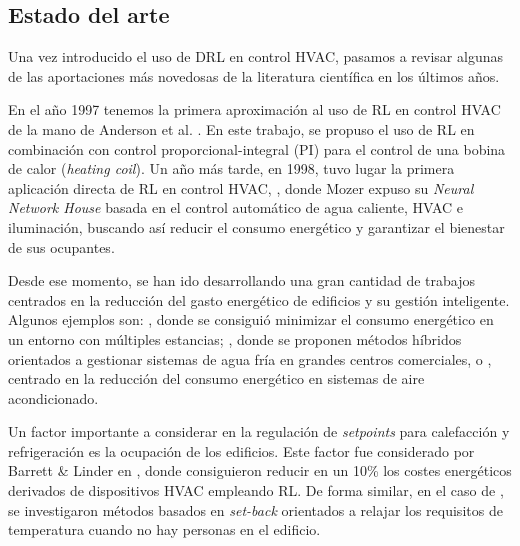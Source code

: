\subsection{Estado del arte}
\label{sec:estado-del-arte}

Una vez introducido el uso de DRL en control HVAC, pasamos a revisar algunas de las aportaciones más novedosas de la literatura científica en los últimos años.

En el año 1997 tenemos la primera aproximación al uso de RL en control HVAC de la mano de Anderson et al. \cite{anderson1997synthesis}. En este trabajo, se propuso el uso de RL en combinación con control proporcional-integral (PI) para el control de una bobina de calor (\textit{heating coil}). Un año más tarde, en 1998, tuvo lugar la primera aplicación directa de RL en control HVAC, \cite{mozer1998neural}, donde Mozer expuso su \textit{Neural Network House} basada en el control automático de agua caliente, HVAC e iluminación, buscando así reducir el consumo energético y garantizar el bienestar de sus ocupantes.

Desde ese momento, se han ido desarrollando una gran cantidad de trabajos centrados en la reducción del gasto energético de edificios y su gestión inteligente. Algunos ejemplos son: \cite{sun2015event}, donde se consiguió minimizar el consumo energético en un entorno con múltiples estancias; \cite{liu2006experimental,liu2007evaluation}, donde se proponen métodos híbridos orientados a gestionar sistemas de agua fría en grandes centros comerciales, o \cite{costanzo2016experimental}, centrado en la reducción del consumo energético en sistemas de aire acondicionado.

Un factor importante a considerar en la regulación de \textit{setpoints} para calefacción y refrigeración es la ocupación de los edificios. Este factor fue considerado por Barrett \& Linder en \cite{barrett2015autonomous}, donde consiguieron reducir en un 10\% los costes energéticos derivados de dispositivos HVAC empleando RL. De forma similar, en el caso de \cite{urieli2013learning, ruelens2015learning}, se investigaron métodos basados en \textit{set-back} orientados a relajar los requisitos de temperatura cuando no hay personas en el edificio.

